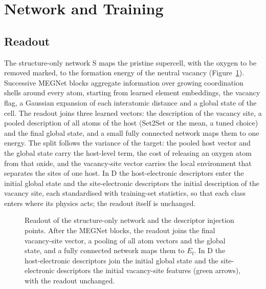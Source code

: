 \section{Network and Training}
\label{app:network}

\subsection{Readout}

The structure-only network S maps the pristine supercell, with the oxygen to be removed marked, to the formation energy of the neutral vacancy (Figure~\ref{fig:app_readout}). Successive MEGNet blocks \citep{Chen2019graph} aggregate information over growing coordination shells around every atom, starting from learned element embeddings, the vacancy flag, a Gaussian expansion of each interatomic distance and a global state of the cell. The readout joins three learned vectors: the description of the vacancy site, a pooled description of all atoms of the host (Set2Set or the mean, a tuned choice) and the final global state, and a small fully connected network maps them to one energy. The split follows the variance of the target: the pooled host vector and the global state carry the host-level term, the cost of releasing an oxygen atom from that oxide, and the vacancy-site vector carries the local environment that separates the sites of one host. In D the host-electronic descriptors enter the initial global state and the site-electronic descriptors the initial description of the vacancy site, each standardised with training-set statistics, so that each class enters where its physics acts; the readout itself is unchanged.

\begin{figure}[H]
\centering
{}
\caption{Readout of the structure-only network and the descriptor injection points. After the MEGNet blocks, the readout joins the final vacancy-site vector, a pooling of all atom vectors and the global state, and a fully connected network maps them to $E_\mathrm{f}$. In D the host-electronic descriptors join the initial global state and the site-electronic descriptors the initial vacancy-site features (green arrows), with the readout unchanged.\label{fig:app_readout}}
\end{figure}

